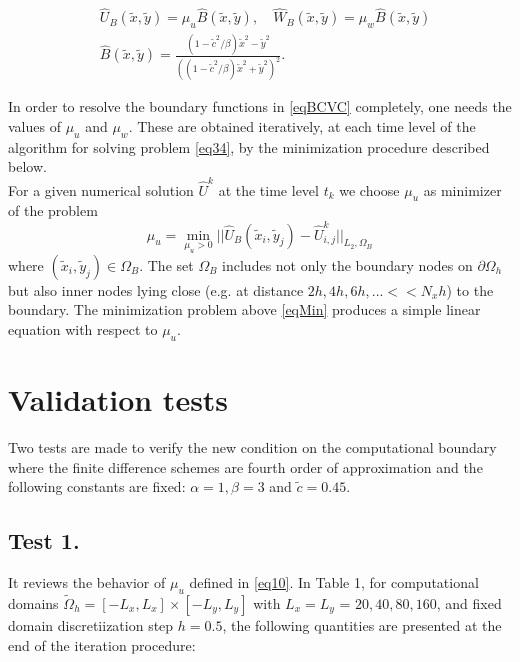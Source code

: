 \documentclass[12pt]{article}
\newcommand{\dO}{\partial\Omega_{h}}
\theoremstyle{theorem}
\theoremstyle{defi}
\begin{document}
\begin{equation}\label{eqBCVC}
\begin{split}
&\widehat U_B(\tilde{x} , \tilde y) = \mu_u \widehat B( \tilde x, \tilde y) , \quad
\widehat W_B(\tilde{x} , \tilde y) = \mu_w \widehat B( \tilde x, \tilde y) \\
&\widehat B(\tilde{x} , \tilde y) = \frac{ (1 - \tilde c^2/ \beta) \tilde x^2 - \tilde y^2}{( (1 - \tilde c^2/ \beta) \tilde x^2 + \tilde y^2)^2}. 
\end{split}
\end{equation}

In order to resolve the boundary functions in \eqref{eqBCVC} completely, one needs the values of $\mu_u$  and $\mu_w$. These are obtained iteratively, at each time level of the algorithm for solving problem \eqref{eq34}, by the minimization procedure described below. 
\\
For a given numerical solution $\widehat U ^k$  at the time level  $t_k$ we choose $\mu_u$  as minimizer of the problem
\begin{equation}\label{eqMin}
\mu_u = \min_{ \mu_u > 0 } || \widehat U_B( \tilde x_i, \tilde y_j) - \widehat U ^k_{i,j} ||_{L_2,\Omega_B}
\end{equation}
where  $( \tilde x_i, \tilde y_j) \in \Omega_B$. The set $\Omega_B$ includes not only the boundary nodes on $\dO$ but also inner nodes lying close (e.g. at distance $2h, 4h, 6h, ... << N_x h $) to the boundary. The minimization problem above \eqref{eqMin} produces a simple linear equation with respect to $\mu_u$.

\section{Validation tests}

Two tests are made to verify the new condition on the computational boundary where the finite difference schemes are fourth order of approximation and the following constants are fixed:
 $\alpha = 1, \beta = 3$  and  $ \tilde c = 0.45$.

\subsection{Test 1.}

It reviews the behavior of $\mu_u$  defined in  \eqref{eq10}. In Table 1, for computational domains  $\tilde \Omega_h = [-L_{ x}, L_{ x}] \times  [-L_{ y}, L_{ y}]$
with $ L_{ x} = L_{ y}$ = $20, 40, 80, 160$, and fixed domain discretiization step $h = 0.5$, the following quantities are presented at the end of the iteration procedure:
\end{document}
